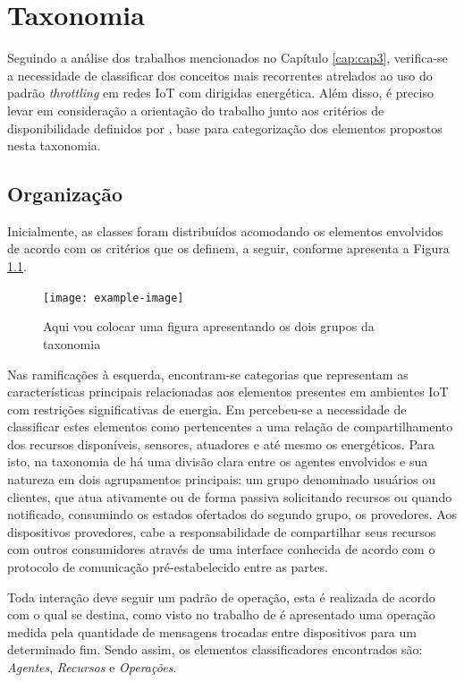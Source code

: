 \chapter{Taxonomia}
\label{cap:cap4}

Seguindo a análise dos trabalhos mencionados no Capítulo \ref{cap:cap3}, verifica-se a necessidade de classificar dos conceitos mais recorrentes atrelados ao uso do padrão \textit{throttling} em redes IoT com dirigidas energética. Além disso, é preciso levar em consideração a orientação do trabalho junto aos critérios de disponibilidade definidos por \cite{avizienis_basic_2004}, base para categorização dos elementos propostos nesta taxonomia. 

\section{Organização}

Inicialmente, as classes foram distribuídos acomodando os elementos envolvidos de acordo com os critérios que os definem, a seguir, conforme apresenta a Figura \ref{fig:taxonomia_geral}.


\begin{figure}[h]
\noindent\texttt{[image: example-image]} 
\caption{Aqui vou colocar uma figura apresentando os dois grupos da taxonomia}
\label{fig:taxonomia_geral}
\centering
\end{figure}

Nas ramificações à esquerda, encontram-se categorias que representam as características principais relacionadas aos elementos presentes em ambientes \acf{IoT} com restrições significativas de energia. Em \cite{kansal_power_2007}  percebeu-se a necessidade de classificar estes elementos como pertencentes a uma relação de compartilhamento dos recursos disponíveis, sensores, atuadores e até mesmo os energéticos. Para isto, na taxonomia de \cite{avizienis_basic_2004} há uma divisão clara entre os agentes envolvidos e sua natureza em dois agrupamentos principais: um grupo denominado usuários ou clientes, que atua ativamente ou de forma passiva solicitando recursos ou quando notificado, consumindo os estados ofertados do segundo grupo, os provedores. Aos dispositivos provedores, cabe a responsabilidade de compartilhar seus recursos com outros consumidores através de uma interface conhecida de acordo com o protocolo de comunicação pré-estabelecido entre as partes.

Toda interação deve seguir um padrão de operação, esta é realizada de acordo com o qual se destina, como visto no trabalho de \cite{khairnar_discrete-rate_2015} é apresentado uma operação medida pela quantidade de mensagens trocadas entre dispositivos para um determinado fim. Sendo assim, os elementos classificadores encontrados são: \textit{Agentes}, \textit{Recursos} e \textit{Operações}.


